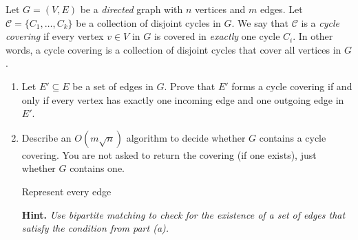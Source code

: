 \documentclass{article}
\begin{document}
\begin{question}
Let $G = (V, E)$ be a {\em directed} graph with $n$ vertices and $m$ edges. Let $\mathscr C = \{C_1, \dots, C_k\}$ be a collection of disjoint cycles in $G$. We say that $\mathscr C$ is a {\em cycle covering} if every vertex $v \in V$ in $G$ is covered in {\em exactly} one cycle $C_i$. In other words, a cycle covering is a collection of disjoint cycles that cover all vertices in $G$.

\begin{enumerate}[label = (\alph*)]
    \item Let $E' \subseteq E$ be a set of edges in $G$. Prove that $E'$ forms a cycle covering if and only if every vertex has exactly one incoming edge and one outgoing edge in $E'$.

    \item Describe an $O(m\sqrt n)$ algorithm to decide whether $G$ contains a cycle covering. You are not asked to return the covering (if one exists), just whether $G$ contains one.

    Represent every edge

    {\bfseries Hint.} {\em Use bipartite matching to check for the existence of a set of edges that satisfy the condition from part (a).}
\end{enumerate}
\end{question}
\end{document}
